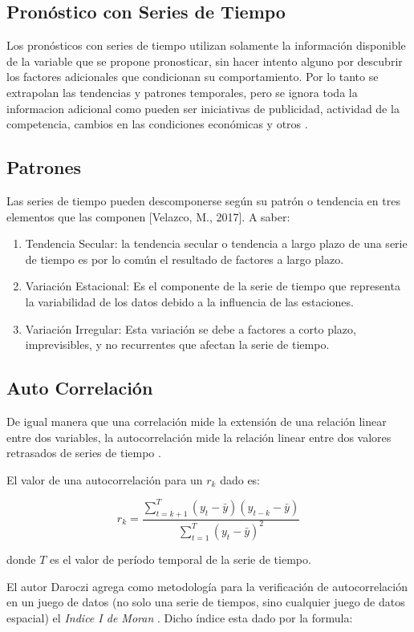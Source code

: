 \documentclass[letterpaper, spanish, 11pt]{report}
\begin{document}
\subsection{Pronóstico con Series de Tiempo}
Los pronósticos con series de tiempo utilizan solamente la información disponible de la variable que se propone pronosticar, sin hacer intento alguno por descubrir los factores adicionales que condicionan su comportamiento. Por lo tanto se extrapolan las tendencias y patrones temporales, pero se ignora toda la informacion adicional como pueden ser iniciativas de publicidad, actividad de la competencia, cambios en las condiciones económicas y otros \cite{hyndman}.

\subsection{Patrones}
Las series de tiempo pueden descomponerse según su patrón o tendencia en tres elementos que las componen [Velazco, M., 2017]. A saber:

\begin{enumerate}
	\item Tendencia Secular: la tendencia secular o tendencia a largo plazo de una serie de tiempo es por lo común el resultado de factores a largo plazo. 
	\item Variación Estacional: Es el componente de la serie de tiempo que representa la variabilidad de los datos debido a la influencia de las estaciones.
	\item Variación Irregular: Esta variación se debe a factores a corto plazo, imprevisibles, y no recurrentes que afectan la serie de tiempo. 
\end{enumerate}

\subsection{Auto Correlación}
De igual manera que una correlación mide la extensión de una relación linear entre dos variables, la autocorrelación mide la relación linear entre dos valores retrasados de series de tiempo \cite{hyndman}.

El valor de una autocorrelación para un \(r_{k}\) dado es:

\[ r_{k} = \frac{\sum_{t = k + 1}^T(y_{t} - \bar{y})(y_{t - k} - \bar{y})}{\sum_{t = 1}^T(y_{t} - \bar{y})^{2}} \]

donde \(T\) es el valor de período temporal de la serie de tiempo. 

El autor Daroczi agrega como metodología para la verificación de autocorrelación en un juego de datos (no solo una serie de tiempos, sino cualquier juego de datos espacial) el \emph{Indice I de Moran} \cite{daroczi}. Dicho índice esta dado por la formula:
\end{document}
